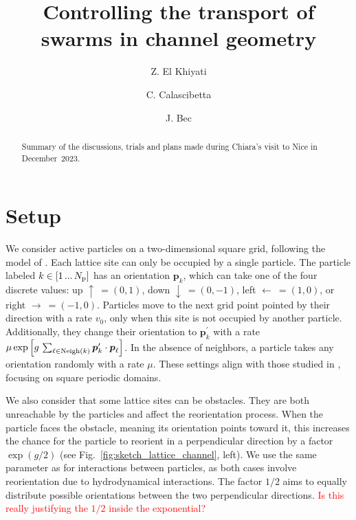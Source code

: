 \documentclass[aps,prl,twocolumn,amsmath,amssymb,superscriptaddress]{revtex4-1}
\newcommand{\obs}[1]{\textcolor{red}{#1}}
\begin{document}
\title{Controlling the transport of swarms in channel geometry}
\author{Z. El Khiyati}
\author{C. Calascibetta}
\author{J. Bec}


\begin{abstract}
Summary of the discussions, trials and plans made during Chiara's visit to Nice in December~2023.
\end{abstract}

\maketitle

\section{Setup}

We consider active particles on a two-dimensional square grid, following the model of \cite{peruani2011traffic}. Each lattice site can only be occupied by a single particle. The particle labeled $k\in[1\,...\,N_{\rm p}]$ has an orientation $\boldsymbol{p}_{k}$, which can take one of the four discrete values: up $\uparrow\ = (0,1)$, down $\downarrow\ = (0,-1)$, left $\leftarrow\ = (1,0)$, or right $\rightarrow\ = (-1,0)$. Particles move to the next grid point pointed by their direction with a rate $v_0$, only when this site is not occupied by another particle. Additionally, they change their orientation to $\boldsymbol{p}^\prime_{k}$ with a rate $\mu\exp \left[g\,\sum_{\ell\in{\rm Neigh}(k)} \boldsymbol{p}^\prime_k \cdot \boldsymbol{p}_{\ell}\right]$. In the absence of neighbors, a particle takes any orientation randomly with a rate $\mu$. These settings align with those studied in \cite{peruani2011traffic}, focusing on square periodic domains.

We also consider that some lattice sites can be obstacles. They are both unreachable by the particles and affect the reorientation process. When the particle faces the obstacle, meaning its orientation points toward it, this increases the chance for the particle to reorient in a perpendicular direction by a factor $\exp(g/2)$ (see Fig.~\ref{fig:sketch_lattice_channel}, left). We use the same parameter as for interactions between particles, as both cases involve reorientation due to hydrodynamical interactions. The factor $1/2$ aims to equally distribute possible orientations between the two perpendicular directions. \obs{Is this really justifying the $1/2$ inside the exponential?}
\end{document}
